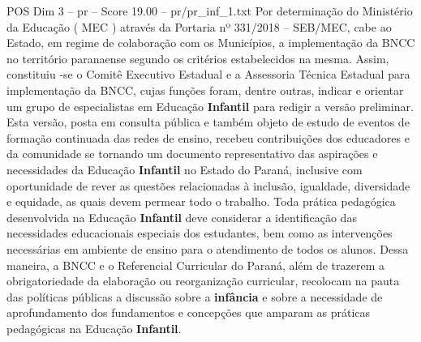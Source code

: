 \begin{textsample}{POS Dim 3 – pr – Score 19.00 – pr/pr\_inf\_1.txt}
Por determinação do Ministério da Educação ( MEC ) através da Portaria nº 331/2018 – SEB/MEC, cabe ao Estado, em regime de colaboração com os Municípios, a implementação da BNCC no território paranaense segundo os critérios estabelecidos na mesma.
Assim, constituiu -se o Comitê Executivo Estadual e a Assessoria Técnica Estadual para implementação da BNCC, cujas funções foram, dentre outras, indicar e orientar um grupo de especialistas em Educação \textbf{Infantil} para redigir a versão preliminar.
Esta versão, posta em consulta pública e também objeto de estudo de eventos de formação continuada das redes de ensino, recebeu contribuições dos educadores e da comunidade se tornando um documento representativo das aspirações e necessidades da Educação \textbf{Infantil} no Estado do Paraná, inclusive com oportunidade de rever as questões relacionadas à inclusão, igualdade, diversidade e equidade, as quais devem permear todo o trabalho.
Toda prática pedagógica desenvolvida na Educação \textbf{Infantil} deve considerar a identificação das necessidades educacionais especiais dos estudantes, bem como as intervenções necessárias em ambiente de ensino para o atendimento de todos os alunos.
Dessa maneira, a BNCC e o Referencial Curricular do Paraná, além de trazerem a obrigatoriedade da elaboração ou reorganização curricular, recolocam na pauta das políticas públicas a discussão sobre a \textbf{infância} e sobre a necessidade de aprofundamento dos fundamentos e concepções que amparam as práticas pedagógicas na Educação \textbf{Infantil}.

\end{textsample}
